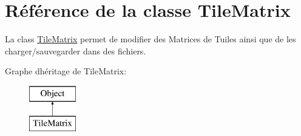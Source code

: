 \hypertarget{class_tile_matrix}{}\section{Référence de la classe Tile\+Matrix}
\label{class_tile_matrix}


La class \hyperlink{class_tile_matrix}{Tile\+Matrix} permet de modifier des Matrices de Tuiles ainsi que de les charger/sauvegarder dans des fichiers.  


Graphe d\textquotesingle{}héritage de Tile\+Matrix\+:\begin{figure}[H]
\begin{center}
\leavevmode
\includegraphics[height=2.000000cm]{class_tile_matrix}
\end{center}
\end{figure}
